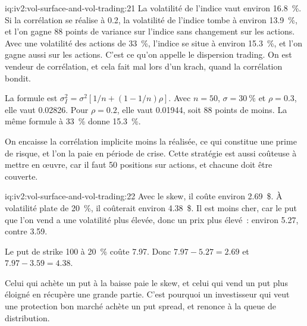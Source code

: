 \begin{solution}{iq:iv2:vol-surface-and-vol-trading:21}
La volatilité de l'indice vaut environ 16.8~\%. Si la corrélation se réalise à 0.2, la volatilité de l'indice tombe à environ 13.9~\%, et l'on gagne 88 points de variance sur l'indice sans changement sur les actions. Avec une volatilité des actions de 33~\%, l'indice se situe à environ 15.3~\%, et l'on gagne aussi sur les actions. C'est ce qu'on appelle le dispersion trading. On est vendeur de corrélation, et cela fait mal lors d'un krach, quand la corrélation bondit.

La formule est $\sigma_I^2 = \sigma^2[1/n + (1 - 1/n)\rho]$. Avec $n = 50$, $\sigma = 30~\%$ et $\rho = 0.3$, elle vaut 0.02826. Pour $\rho = 0.2$, elle vaut 0.01944, soit 88 points de moins. La même formule à 33~\% donne 15.3~\%.

On encaisse la corrélation implicite moins la réalisée, ce qui constitue une prime de risque, et l'on la paie en période de crise. Cette stratégie est aussi coûteuse à mettre en œuvre, car il faut 50 positions sur actions, et chacune doit être couverte.

\end{solution}

\begin{solution}{iq:iv2:vol-surface-and-vol-trading:22}
Avec le skew, il coûte environ 2.69~\$. À volatilité plate de 20~\%, il coûterait environ 4.38~\$. Il est moins cher, car le put que l'on vend a une volatilité plus élevée, donc un prix plus élevé~: environ 5.27, contre 3.59.

Le put de strike 100 à 20~\% coûte 7.97. Donc $7.97 - 5.27 = 2.69$ et $7.97 - 3.59 = 4.38$.

Celui qui achète un put à la baisse paie le skew, et celui qui vend un put plus éloigné en récupère une grande partie. C'est pourquoi un investisseur qui veut une protection bon marché achète un put spread, et renonce à la queue de distribution.

\end{solution}


